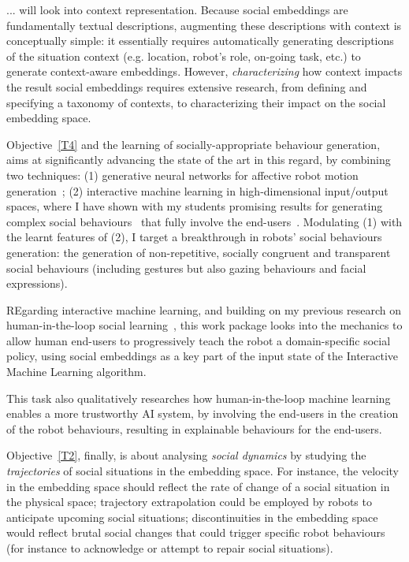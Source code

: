 ... will look into context representation. Because social
embeddings are fundamentally textual descriptions, augmenting these descriptions
with context is conceptually simple: it essentially requires automatically
generating descriptions of the situation context (e.g. location, robot's role,
on-going task, etc.) to generate context-aware embeddings. However,
\emph{characterizing} how context impacts the result social embeddings requires
extensive research, from defining and specifying a taxonomy of contexts, to
characterizing their impact on the social embedding space.



Objective~\ref{T4} and the learning of socially-appropriate behaviour
generation, \project aims at significantly advancing the state of the art in
this regard, by combining two techniques: (1) generative neural networks
for affective robot motion
generation~\cite{marmpena2019generating,suguitan2020moveae}; (2) interactive
machine learning in high-dimensional input/output spaces, where I have shown
with my students promising results for generating complex social
behaviours~\cite{senft2019teaching, winkle2020couch} that fully involve the
end-users~\cite{winkle2018social}. Modulating (1) with the learnt features of
(2), I target a breakthrough in robots' social behaviours generation: the
generation of non-repetitive, socially congruent and transparent social
behaviours (including gestures but also gazing behaviours and facial
expressions).

REgarding interactive machine learning, and building on my previous research on human-in-the-loop social
learning~\cite{senft2017supervised, senft2019teaching,
winkle2020couch,winkle2021leador}, this work package looks into the mechanics to
allow human end-users to progressively teach the robot a domain-specific social
policy, using social embeddings as a key part of the input state of the
Interactive Machine Learning algorithm.

This task also qualitatively researches how human-in-the-loop machine
learning enables a more trustworthy AI system, by involving the end-users in the
creation of the robot behaviours, resulting in explainable behaviours for the
end-users.



Objective~\ref{T2}, finally, is about analysing \emph{social dynamics} by
studying the \emph{trajectories} of social situations in the embedding space.
For instance, the velocity in the embedding space should reflect the rate of
change of a social situation in the physical space; trajectory extrapolation
could be employed by robots to anticipate upcoming social situations;
discontinuities in the embedding space would reflect brutal social changes that
could trigger specific robot behaviours (for instance to acknowledge or attempt
to repair social situations).


